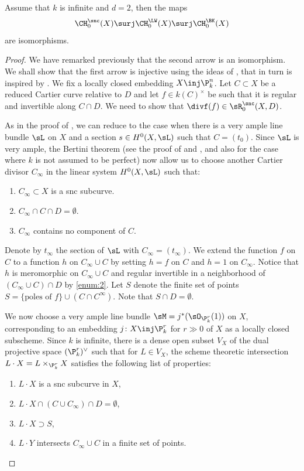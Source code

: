 \begin{prop}\label{prop:snc-surface}
Assume that $k$ is infinite and $d =2$, then the maps
\[
\CH^{\snc}_0(X) \surj \CH^{\LW}_0(X) \surj \CH_0^{\BK}(X)
\]
are isomorphisms.
\end{prop}
\begin{proof}
We have remarked previously that the second arrow is an isomorphism.
We shall show that the first arrow is injective using the ideas of
\cite[Lem.\,5.5]{BK}, that in turn is inspired by \cite[Lem.\,1.4]{Levine-2}.
We fix a locally closed embedding $X \inj \P^n_k$.
Let $C \subset X$ be a reduced Cartier curve relative to $D$ and
let $f \in k(C)^{\times}$ be such that it is regular and invertible along
$C \cap D$. We need to show that $\divf(f) \in \sR^{\snc}_0(X,D)$.

As in the proof of \cite[Lem.\,1.4]{Levine-2}, we can reduce to the case
when there is a very ample line bundle $\sL$ on $X$ and a section
$s \in H^0(X, \sL)$ such that $C = (t_0)$. Since $\sL$ is very ample,
the Bertini theorem (see the proof of \cite[Lem.\,1.3]{Levine-2}
and \cite[Chap.\,6]{Jou},
and also \cite{GK} for the case where $k$ is not assumed to be perfect)
now allow us to choose another Cartier divisor $C_{\infty}$ in the linear
system $H^0(X, \sL)$ such that:
\begin{enumerate}
\item\label{enum:1}
$C_{\infty} \subset X$ is a snc subcurve.
\item\label{enum:2}
$C_{\infty} \cap C \cap D = \emptyset$.
\item\label{enum:3}
$C_{\infty}$ contains no component of $C$.
\end{enumerate}

Denote by $t_{\infty}$ the section of $\sL$ with $C_\infty = (t_{\infty})$.
We extend the function $f$ on $C$ to a function $h$ on
$C_{\infty} \cup C$ by setting $h=f$ on $C$ and $h=1$ on $C_{\infty}$. Notice
that $h$ is meromorphic on $C_{\infty} \cup C$ and regular
invertible in a neighborhood of $(C_{\infty} \cup C) \cap D$ by \eqref{enum:2}. Let $S$
denote the finite set of points
$S = \{\text{poles of $f$}\} \cup (C\cap C^{\infty})$.
Note that $S\cap D = \emptyset$.

We now choose a very ample line bundle $\sM = j^*(\sO_{\P^r_k}(1))$ on $X$,
corresponding to an embedding $j\colon X \inj \P^r_k$ for $r \gg 0$ of $X$ as
a locally closed subscheme. Since $k$ is infinite, there is a dense open
subset $V_X$ of the dual projective space $(\P_k^r)^\vee$ such that for
$L \in V_X$, the scheme theoretic intersection $L\cdot X = L\times_{\P^r_k} X$
satisfies the following list of properties:
\begin{enumerate}\renewcommand{\theenumi}{\alph{enumi}}
\item\label{enum:a} $L\cdot X$ is a snc subcurve in $X$,
\item\label{enum:b} $L\cdot X \cap (C\cup C_\infty) \cap D = \emptyset$,
\item\label{enum:c} $L\cdot X\supset S$,
\item\label{enum:d} $L\cdot Y$ intersects $C_{\infty} \cup C$ in a finite set of points.
\end{enumerate}


\end{proof}
